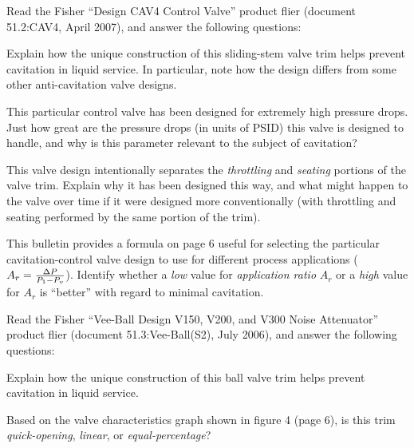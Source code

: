 

Read the Fisher ``Design CAV4 Control Valve'' product flier (document 51.2:CAV4, April 2007), and answer the following questions:

\vskip 10pt

Explain how the unique construction of this sliding-stem valve trim helps prevent cavitation in liquid service.  In particular, note how the design differs from some other anti-cavitation valve designs.

\vskip 10pt

This particular control valve has been designed for extremely high pressure drops.  Just how great are the pressure drops (in units of PSID) this valve is designed to handle, and why is this parameter relevant to the subject of cavitation?

\vskip 10pt

This valve design intentionally separates the {\it throttling} and {\it seating} portions of the valve trim.  Explain why it has been designed this way, and what might happen to the valve over time if it were designed more conventionally (with throttling and seating performed by the same portion of the trim).

\vskip 10pt

This bulletin provides a formula on page 6 useful for selecting the particular cavitation-control valve design to use for different process applications ($A_r = {{\Delta P} \over {P_1 - P_v}}$).  Identify whether a {\it low} value for {\it application ratio} $A_r$ or a {\it high} value for $A_r$ is ``better'' with regard to minimal cavitation.

\vskip 30pt

Read the Fisher ``Vee-Ball Design V150, V200, and V300 Noise Attenuator'' product flier (document 51.3:Vee-Ball(S2), July 2006), and answer the following questions:

\vskip 10pt

Explain how the unique construction of this ball valve trim helps prevent cavitation in liquid service.

\vskip 10pt

Based on the valve characteristics graph shown in figure 4 (page 6), is this trim {\it quick-opening}, {\it linear}, or {\it equal-percentage}?


